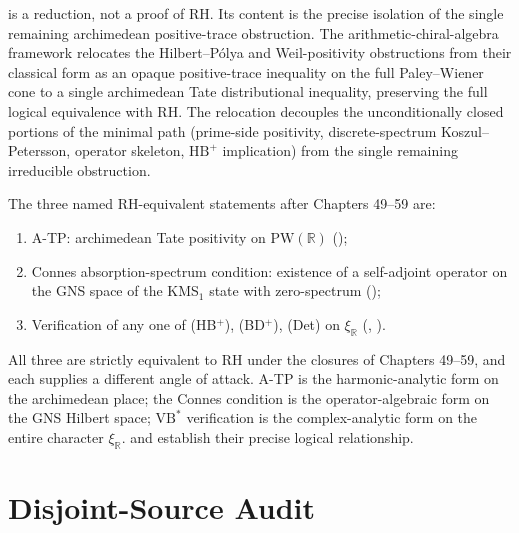 \begin{remark}[Reduction to A-TP]
\label{v4-arith:w5-synth:rem:honest-reduction}
 is a reduction, not a
proof of RH. Its content is the precise isolation of the single
remaining archimedean positive-trace obstruction. The
arithmetic-chiral-algebra framework relocates the Hilbert--P\'{o}lya
and Weil-positivity obstructions from their classical form as an
opaque positive-trace inequality on the full Paley--Wiener cone to a
single archimedean Tate distributional inequality, preserving the
full logical equivalence with RH. The relocation decouples the
unconditionally closed portions of the minimal path (prime-side
positivity, discrete-spectrum Koszul--Petersson, operator skeleton,
\(\mathrm{HB}^{+}\) implication) from the single remaining
irreducible obstruction.
\end{remark}

\begin{remark}
\label{v4-arith:w5-synth:rem:ATP-equivalences}
The three named RH-equivalent statements after Chapters 49--59 are:
\begin{enumerate}
\item A-TP: archimedean Tate positivity on
\(\mathrm{PW}(\mathbb{R})\)
();
\item Connes absorption-spectrum condition: existence of a
self-adjoint operator on the GNS space of the KMS\({}_{1}\) state
with zero-spectrum
();
\item Verification of any one of (HB\(^{+}\)), (BD\(^{+}\)), (Det) on
\(\xi_{\mathbb{R}}\)
(,
).
\end{enumerate}
All three are strictly equivalent to RH under the closures of
Chapters 49--59, and each supplies a different angle of attack.
A-TP is the harmonic-analytic form on the archimedean place; the
Connes condition is the operator-algebraic form on the GNS Hilbert
space; \(\mathrm{VB}^{*}\) verification is the complex-analytic form
on the entire character \(\xi_{\mathbb{R}}\).
 and
establish their precise logical relationship.
\end{remark}

\section{Disjoint-Source Audit}
\label{v4-arith:w5-synth:disjoint-audit}

